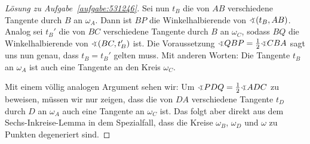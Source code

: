\begin{proof}[Lösung zu Aufgabe~\ref{aufgabe:531246}]
	Sei nun $t_B$ die von $AB$ verschiedene Tangente durch $B$ an $\omega_A$. Dann ist $BP$ die Winkelhalbierende von $\winkel (t_B,AB)$. Analog sei $t_B'$ die von $BC$ verschiedene Tangente durch $B$ an $\omega_C$, sodass $BQ$ die Winkelhalbierende von $\winkel (BC,t_B')$ ist. Die Voraussetzung $\winkel QBP=\frac12\winkel CBA$ sagt uns nun genau, dass $t_B=t_B'$ gelten muss. Mit anderen Worten: Die Tangente $t_B$ an $\omega_A$ ist auch eine Tangente an den Kreis $\omega_C$.
	
	Mit einem völlig analogen Argument sehen wir: Um $\winkel PDQ=\frac12\winkel ADC$ zu beweisen, müssen wir nur zeigen, dass die von $DA$ verschiedene Tangente $t_D$ durch $D$ an $\omega_A$ auch eine Tangente an $\omega_C$ ist. Das folgt aber direkt aus dem Sechs-Inkreise-Lemma in dem Spezialfall, dass die Kreise $\omega_B$, $\omega_D$ und $\omega$ zu Punkten degeneriert sind.
\end{proof}